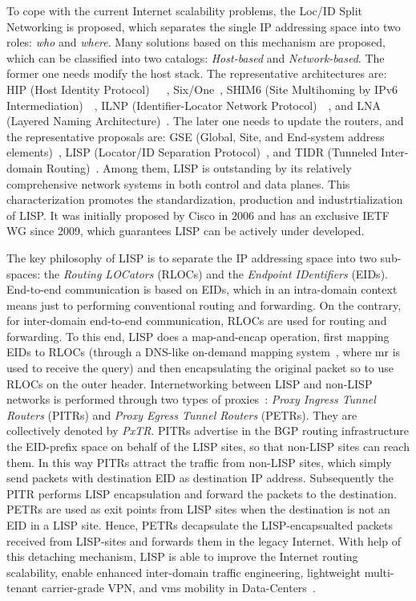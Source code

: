 To cope with the current Internet scalability problems, the Loc/ID Split Networking is proposed, which separates the single IP addressing space into two roles: \emph{who} and \emph{where}. Many solutions based on this mechanism are proposed, which can be classified into two catalogs: \emph{Host-based} and \emph{Network-based}. The former one needs modify the host stack. The representative architectures are: HIP (Host Identity Protocol)~\cite{nikander2010host}~\cite{Moskowitz2017host}~\cite{moskowitz2015host}, Six/One~\cite{vogt2007six}, SHIM6 (Site Multihoming by IPv6 Intermediation)~\cite{garcia2010shim6}~\cite{nordmark2009shim6}, ILNP (Identifier-Locator Network Protocol)~\cite{bhatti2012identifier}~\cite{atkinson2010evolving}, and LNA (Layered Naming Architecture)~\cite{balakrishnan2004layered}. The later one needs to update the routers, and the representative proposals are: GSE (Global, Site, and End-system address elements)~\cite{o2006gse}, LISP (Locator/ID Separation Protocol)~\cite{rfc6830}, and TIDR (Tunneled Inter-domain Routing)~\cite{adan2006tunneled}. Among them, LISP is outstanding by its relatively comprehensive network systems in both control and data planes. This characterization promotes the standardization, production and industrtialization of LISP. It was initially proposed by Cisco in 2006 and has an exclusive IETF WG since 2009, which guarantees LISP can be actively under developed.

The key philosophy of LISP is to separate the IP addressing space into two sub-spaces: the \emph{Routing LOCators} (RLOCs) and the \emph{Endpoint IDentifiers} (EIDs). End-to-end communication is based on EIDs, which in an intra-domain context means just to performing conventional routing and forwarding. On the contrary, for inter-domain end-to-end communication, RLOCs are used for routing and forwarding. To this end, LISP does a map-and-encap operation, first mapping EIDs to RLOCs (through a DNS-like on-demand mapping system~\cite{lispALTPourri}, where \acrfull{mr} is used to receive the query) and then encapsulating the original packet so to use RLOCs on the outer header. Internetworking between LISP and non-LISP networks is performed through two types of proxies~\cite{rfc6832}: \emph{Proxy Ingress Tunnel Routers} (PITRs) and \emph{Proxy Egress Tunnel Routers} (PETRs). They are collectively denoted by \emph{PxTR}. PITRs advertise in the BGP  routing infrastructure the EID-prefix space on behalf of the LISP sites, so that non-LISP sites can reach them. In this way PITRs attract the traffic from non-LISP sites, which simply send packets with destination EID as destination IP address. Subsequently the PITR performs LISP encapsulation and forward the packets to the destination. PETRs are used as exit points from LISP sites when the destination is not an EID in a LISP site. Hence, PETRs decapsulate the LISP-encapsualted packets received from LISP-sites and forwards them in the legacy Internet. With help of this detaching mechanism, LISP is able to improve the Internet routing scalability, enable enhanced inter-domain traffic engineering, lightweight multi-tenant carrier-grade VPN, and \acrshort{vm}s mobility in Data-Centers~\cite{saucez2012designing}.

